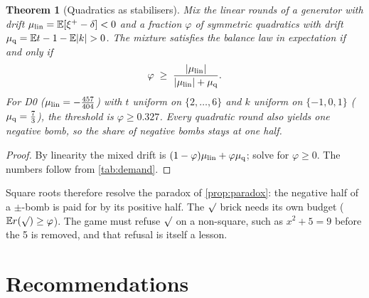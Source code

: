 \documentclass[11pt,a4paper]{article}
\newtheorem{theorem}{Theorem}[section]
\theoremstyle{definition}
\theoremstyle{remark}
\newcommand{\E}{\mathbb{E}}
\newcommand{\sq}{\ensuremath{\surd}}
\newcommand{\abs}[1]{\lvert #1\rvert}
\newcommand{\pos}[1]{{#1}^{+}}
\begin{document}
\begin{theorem}[Quadratics as stabilisers]\label{thm:stabilise}
Mix the linear rounds of a generator with drift $\mu_{\rm lin}=\E[\pos\xi-\delta]<0$ and
a fraction $\varphi$ of symmetric quadratics with drift
$\mu_{\rm q}=\E t-1-\E\abs k>0$. The mixture satisfies the balance law in expectation if
and only if
\[
\varphi\;\ge\;\frac{\abs{\mu_{\rm lin}}}{\abs{\mu_{\rm lin}}+\mu_{\rm q}}.
\]
For D0 ($\mu_{\rm lin}=-\frac{457}{404}$) with $t$ uniform on $\{2,\dots,6\}$ and $k$
uniform on $\{-1,0,1\}$ ($\mu_{\rm q}=\frac73$), the threshold is $\varphi\ge0.327$.
Every quadratic round also yields one negative bomb, so the share of negative bombs
stays at one half.
\end{theorem}
\begin{proof}
By linearity the mixed drift is $(1-\varphi)\mu_{\rm lin}+\varphi\mu_{\rm q}$; solve
for $\varphi\ge0$. The numbers follow from \cref{tab:demand}.
\end{proof}

Square roots therefore resolve the paradox of \cref{prop:paradox}: the negative half of a
$\pm$-bomb is paid for by its positive half. The $\sq$ brick needs its own budget
($\E r(\sq)\ge\varphi$). The game must refuse $\sq$ on a non-square, such as
$x^2+5=9$ before the 5 is removed, and that refusal is itself a lesson.

\section{Recommendations}\label{sec:recommend}
\end{document}
